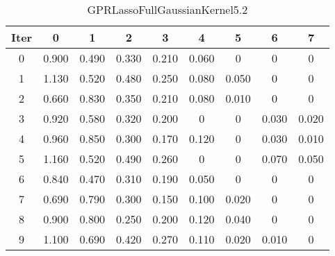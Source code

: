\begin{table}
	\begin{center}
		\begin{tabular}{|c|c|c|c|c|c|c|c|c|}
			\hline
			Iter & 0 & 1 & 2 & 3 & 4 & 5 & 6 & 7 \\
			\hline
			0 & 0.900 & 0.490 & 0.330 & 0.210 & 0.060 & 0 & 0 & 0 \\
			\hline
			1 & 1.130 & 0.520 & 0.480 & 0.250 & 0.080 & 0.050 & 0 & 0 \\
			\hline
			2 & 0.660 & 0.830 & 0.350 & 0.210 & 0.080 & 0.010 & 0 & 0 \\
			\hline
			3 & 0.920 & 0.580 & 0.320 & 0.200 & 0 & 0 & 0.030 & 0.020 \\
			\hline
			4 & 0.960 & 0.850 & 0.300 & 0.170 & 0.120 & 0 & 0.030 & 0.010 \\
			\hline
			5 & 1.160 & 0.520 & 0.490 & 0.260 & 0 & 0 & 0.070 & 0.050 \\
			\hline
			6 & 0.840 & 0.470 & 0.310 & 0.190 & 0.050 & 0 & 0 & 0 \\
			\hline
			7 & 0.690 & 0.790 & 0.300 & 0.150 & 0.100 & 0.020 & 0 & 0 \\
			\hline
			8 & 0.900 & 0.800 & 0.250 & 0.200 & 0.120 & 0.040 & 0 & 0 \\
			\hline
			9 & 1.100 & 0.690 & 0.420 & 0.270 & 0.110 & 0.020 & 0.010 & 0 \\
			\hline
		\end{tabular}
	\end{center}
	\caption{GPRLassoFullGaussianKernel5.2}
\end{table}
